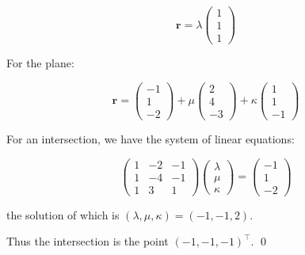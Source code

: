 \documentclass[12pt]{article}
\begin{document}
\begin{equation}
    \mathbf{r} =
    \lambda \begin{pmatrix}
        1 \\
        1 \\
        1
    \end{pmatrix}
\end{equation}

For the plane:

\begin{equation}
    \mathbf{r} =
    \begin{pmatrix}
        -1 \\
        1  \\
        -2
    \end{pmatrix}
    +
    \mu \begin{pmatrix}
        2 \\
        4 \\
        -3
    \end{pmatrix}
    +
    \kappa \begin{pmatrix}
        1 \\
        1 \\
        -1
    \end{pmatrix}
\end{equation}

For an intersection, we have the system of linear equations:

\begin{equation}
    \begin{pmatrix}
        1 & -2 & -1 \\
        1 & -4 & -1 \\
        1 & 3  & 1
    \end{pmatrix}
    \begin{pmatrix}
        \lambda \\
        \mu     \\
        \kappa
    \end{pmatrix}
    =
    \begin{pmatrix}
        -1 \\
        1  \\
        -2
    \end{pmatrix}
\end{equation}

the solution of which is $(\lambda, \mu, \kappa) = (-1, -1, 2)$.

Thus the intersection is the point $(-1, -1, -1)^{\intercal}$.
\qed
\end{document}
